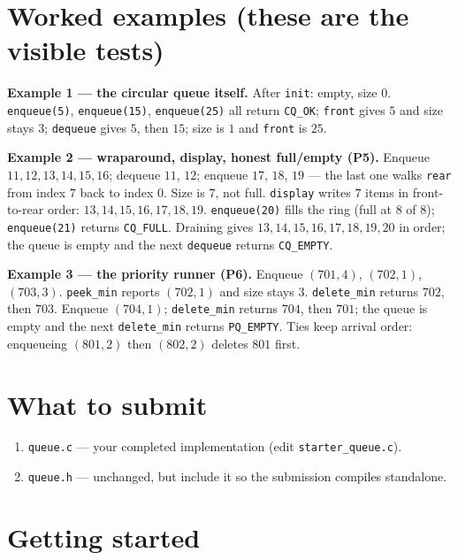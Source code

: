 \documentclass[11pt]{article}
\begin{document}
\section{Worked examples (these are the visible tests)}

\textbf{Example 1 --- the circular queue itself.} After \texttt{init}: empty, size $0$. \texttt{enqueue(5)}, \texttt{enqueue(15)}, \texttt{enqueue(25)} all return \texttt{CQ\_OK}; \texttt{front} gives $5$ and size stays $3$; \texttt{dequeue} gives $5$, then $15$; size is $1$ and \texttt{front} is $25$.

\textbf{Example 2 --- wraparound, display, honest full/empty (P5).} Enqueue $11, 12, 13, 14, 15, 16$; dequeue $11$, $12$; enqueue $17$, $18$, $19$ --- the last one walks \texttt{rear} from index $7$ back to index $0$. Size is $7$, not full. \texttt{display} writes $7$ items in front-to-rear order: $13, 14, 15, 16, 17, 18, 19$. \texttt{enqueue(20)} fills the ring (full at $8$ of $8$); \texttt{enqueue(21)} returns \texttt{CQ\_FULL}. Draining gives $13, 14, 15, 16, 17, 18, 19, 20$ in order; the queue is empty and the next \texttt{dequeue} returns \texttt{CQ\_EMPTY}.

\textbf{Example 3 --- the priority runner (P6).} Enqueue $(701, 4)$, $(702, 1)$, $(703, 3)$. \texttt{peek\_min} reports $(702, 1)$ and size stays $3$. \texttt{delete\_min} returns $702$, then $703$. Enqueue $(704, 1)$; \texttt{delete\_min} returns $704$, then $701$; the queue is empty and the next \texttt{delete\_min} returns \texttt{PQ\_EMPTY}. Ties keep arrival order: enqueueing $(801, 2)$ then $(802, 2)$ deletes $801$ first.

\section{What to submit}

\begin{enumerate}
  \item \texttt{queue.c} --- your completed implementation (edit \texttt{starter\_queue.c}).
  \item \texttt{queue.h} --- unchanged, but include it so the submission compiles standalone.
\end{enumerate}

\section{Getting started}
\end{document}
